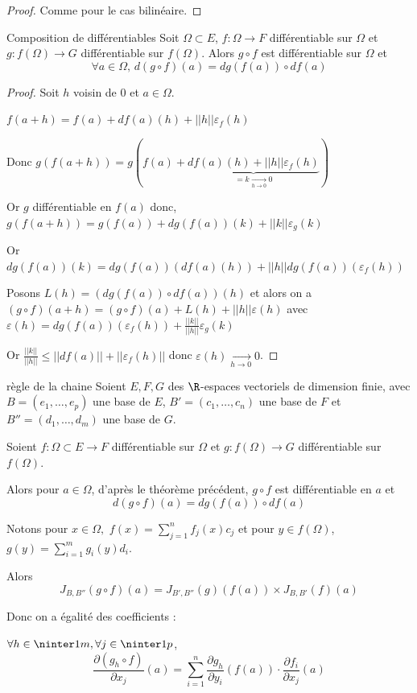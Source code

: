 \begin{proof}
    Comme pour le cas bilinéaire. 
\end{proof}

\begin{proposition}{Composition de différentiables}{}
    Soit $\Omega \subset E$, $f : \Omega \to F$ différentiable sur $\Omega$ et
    $g : f(\Omega) \to G$ différentiable sur $f(\Omega)$. Alors 
    $g \circ f$ est différentiable sur $\Omega$ et
    $$\forall a \in \Omega, \, d(g \circ f)(a) = dg(f(a)) \circ df(a)$$
\end{proposition}

\begin{proof}
    Soit $h$ voisin de $0$ et $a \in \Omega$. 

    $f(a + h) = f(a) + df(a)(h) + ||h|| \varepsilon_f(h)$

    Donc $g(f(a + h)) = g(f(a) + \underbrace{df(a)(h) + ||h|| \varepsilon_f(h)}_{ = k \xrightarrow[h \to 0]{} 0})$

    Or $g$ différentiable en $f(a)$ donc, 
    $g(f(a + h)) = g(f(a)) + dg(f(a))(k) + ||k|| \varepsilon_g(k)$

    Or $dg(f(a))(k) = dg(f(a))(df(a)(h)) + ||h|| dg(f(a))(\varepsilon_f(h))$

    Posons $L(h) = (dg(f(a)) \circ df(a))(h)$ et alors on a 
    $(g \circ f)(a + h) = (g \circ f)(a) + L(h) + ||h|| \varepsilon (h)$ avec
    $\varepsilon (h) = dg(f(a))(\varepsilon_f(h)) + \frac{||k||}{||h||} \varepsilon_g(k)$

    Or $\displaystyle \frac{||k||}{||h||} \leqslant ||df(a)|| + ||\varepsilon_f(h)||$ donc
    $\varepsilon (h) \xrightarrow[h \to 0 ]{} 0$.
\end{proof}


\begin{corollaire}{règle de la chaine}{}
    Soient $E, F, G$ des $\R$-espaces vectoriels de dimension finie, avec 
    $B = (e_1, \ldots, e_p)$ une base de $E$, $B' = (c_1, \ldots, c_n)$ une base de $F$
    et $B'' = (d_1, \ldots, d_m)$ une base de $G$.

    Soient $f : \Omega \subset E \to F$ différentiable sur $\Omega$ et
    $g : f(\Omega) \to G$ différentiable sur $f(\Omega)$.

    Alors pour $a \in \Omega$, d'après le théorème précédent, $g \circ f$ est différentiable en $a$
    et 
    $$d(g \circ f)(a) = dg(f(a)) \circ df(a)$$

    Notons pour $x \in \Omega, $ $\displaystyle f(x) = \sum_{j = 1 }^{n } f_j(x) c_j$ et
    pour $y \in f(\Omega)$, $\displaystyle g(y) = \sum_{i = 1 }^{m } g_i(y) d_i$.

    Alors 
    $$J_{B, B''}(g \circ f)(a) = J_{B', B''}(g)(f(a)) \times J_{B, B'}(f)(a)$$

    Donc on a égalité des coefficients : 

    $\forall h \in \ninter 1 m, \forall j \in \ninter 1 p$, 
    $$\frac{\partial (g_h \circ f)}{\partial x_j} (a) = \sum_{i = 1 }^{n } \frac{\partial g_h}{\partial y_i} (f(a)) \cdot \frac{\partial f_i}{\partial x_j} (a)$$
\end{corollaire}

